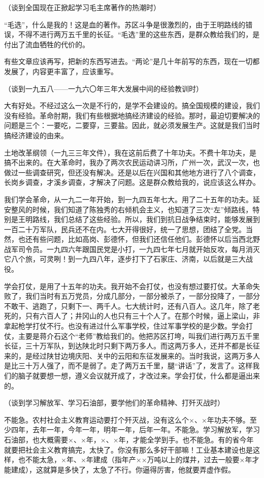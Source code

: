 （谈到全国现在正掀起学习毛主席著作的热潮时）

“毛选”，什么是我的！这是血的著作。苏区斗争是很激烈的，由于王明路线的错误，不得不进行两万五千里的长征。“毛选”里的这些东西，是群众教给我们的，是付出了流血牺牲的代价的。

有些文章应该再写，把新的东西写进去。“两论”是几十年前写的东西，现在一切都发展了，内容更丰富了，应该重写。

（谈到一九五八——一九六〇年三年大发展中间的经验教训时）

大有好处。不经过这么一次是不行的，是学不会建设的。搞全国规模的建设，我们没有经验。革命肘期，我们有些根据地搞经济建设的经验。那时，最迫切要解决的问题是三个：一要吃，二要穿，三要盐。因此，就必须发展生产。这就是我们当时搞经济建设的由来。

土地改革纲领（一九三三年文件），我在这前后费了十年功夫。不费十年功夫，是搞不出来的。在大革命时，我办了两次农民运动讲习所，广州一次，武汉一次，也做过一些调查研究，但还没有解决。还是以后在兴国和其他地方进行了八个调查，长岗乡调查，才溪乡调查，才解决了问题。这是群众教给我的，说应该这么样办。

我们学会革命，从一九二一年开始，到一九四五年七大。用了二十五年的功夫。延安整风的时候，我们知道了陈独秀的右倾机会主义，也知道了三次“左”倾路线，特别是王明路线，我们总结了这些经验。所以，我们到抗日战争结束时，能够发展到一百二十万军队，民兵还不在内。七大开得很好，统一了思想，团结了全党。当然，也还有些问题，比如高岗、彭德怀，但我们还信任他们。彭德怀以后当西北野战军司令员。一九四六年跟国民党是小打，一九四七年七月就开始反攻，每月消灭它八个旅，可灵咧！到一九四八年，逐步打下了石家庄、济南，以后就是三大战役。

学会打仗，是用了十五年的功夫。我开始不会打仗，也没有想过要打仗。大革命失败了，我们当时有五万党员，分成几部分，一部分被杀了，一部分投降了，一部分不敢干、逃跑了，只剩下一、两千人。七大统计时，还有八百人。这几年，除了老死的，只有六百人了；井冈山的人也只有三十个人了。在那个时候，逼上梁山，非拿起枪学打仗不行。也没有进过什么军事学校，住过军事学校的是少数。学会打仗，主要是蒋介石这个“老师”教给我们的。他把苏区打垮，叫我们进行两万五千里长征，三十万军队，到达陕北时只剩下两万多人。而这两万多人，还并不都是长征来的，是经过陕甘边境庆阳、关中的云阳和东征发展来的。当时我说，这两万多人是比三十万人强了，而不是弱了。走了两万五千里，腿“讲话”了，发言了。这样我们的脑子就要想一想，遵义会议就开成了，才改过来。学会打仗，什么都是逼出来的。

（谈到学习解放军、学习石油部，要学他们的革命精神、打歼灭战时）

不能急。农村社会主义教育运动要打个歼灭战，没有这么个×、×年功夫不够。至少四年，去年一年，今年一年，明年一年，后年一年。不能急。学习解放军，学习石油部，也大概需要×、×年，×、×年，才能全学到手。也不能急。有的省今年就要把社会主义教育搞完，太快了。你没有那么多好干部嘛！工业基本建设也是这样，也不能太急，×年、×年建成（指年产××万吨以上的煤井，过去一般要×年才能建成），这就算是多快了，太急了不行。你逼得厉害，他就要弄虚作假。

